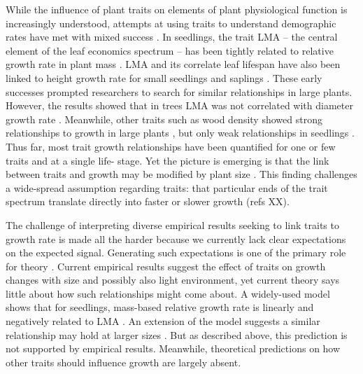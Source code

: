 \documentclass[12pt, a4paper]{article}
\begin{document}
While the influence of plant traits on elements of plant physiological
function is increasingly understood, attempts at using traits to understand
demographic rates have met with mixed success
 \citep{wright-2010, poorter-2008}. In seedlings, the trait LMA
-- the central element of the leaf economics spectrum
 \citep{wright_world-2004} -- has been tightly related to relative growth
rate in plant mass \citep{lambers-1992, wright_cross-2000}. LMA and
its correlate leaf lifespan have also been linked to height growth rate for
small seedlings and saplings \citep{reich-1992, poorter-2006}. These
early successes prompted researchers to search for similar relationships in
large plants. However, the results showed that in trees LMA was not correlated
with diameter growth rate  \citep{wright-2010, poorter-2008,
herault-2011}. Meanwhile, other traits such as wood density showed
strong relationships to growth in large plants \citep{wright-2010},
but only weak relationships in seedlings  \citep{castro-diez-1998}. Thus
far, most trait growth relationships have been quantified for one or few
traits and at a single life- stage. Yet the picture is emerging is that the
link between traits and growth may be modified by plant size
 \citep{ruger-2012}. This finding challenges a wide-spread
assumption regarding traits: that particular ends of the trait spectrum translate directly into
faster or slower growth (refs XX).

The challenge of interpreting diverse empirical results seeking to link
traits to growth rate is made all the harder because we currently lack clear
expectations on the expected signal. Generating such expectations is one of the
primary role for theory \citep{kokko-2007}. Current empirical
results suggest the effect of traits on growth changes with size and possibly
also light environment, yet current theory says little about how such
relationships might come about. A widely-used model shows that for seedlings,
mass-based relative growth rate is linearly and negatively related to LMA
 \citep{lambers-1992, cornelissen-1996,
wright_cross-2000}. An extension of the model suggests a similar
relationship may hold at larger sizes \citep{enquist-2007}. But as
described above, this prediction is not supported by empirical results.
Meanwhile, theoretical predictions on how other traits should influence growth
are largely absent.
\end{document}
